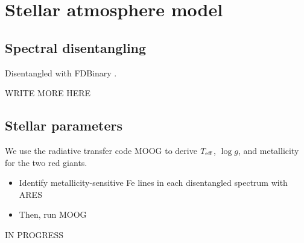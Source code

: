 \section{Stellar atmosphere model}\label{atm}

\subsection{Spectral disentangling}\label{disentangle}
Disentangled with FDBinary \citep{ili04}.

WRITE MORE HERE

\subsection{Stellar parameters}\label{parameters}
We use the radiative transfer code MOOG \citep{sne73} to derive $T_{\rm{eff}}$, $\log g$, and metallicity for the two red giants.
\begin{itemize}
\item Identify metallicity-sensitive Fe lines in each disentangled spectrum with ARES
\item Then, run MOOG
\end{itemize}

IN PROGRESS